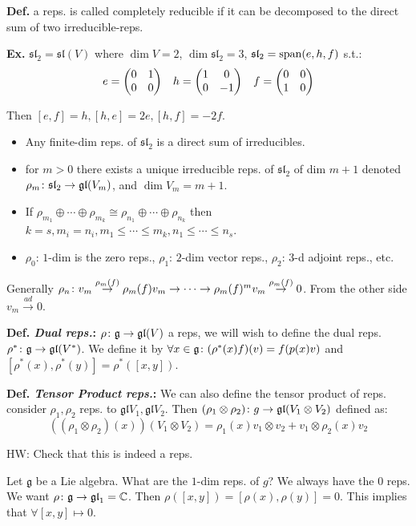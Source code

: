 \documentclass[]{../../../../tex/classes/styledArticle}
\newcommand\gl {\mathfrak{gl}}
\newcommand\g  {\mathfrak{g}}
\newcommand\Sl {\mathfrak{sl}}
\begin{document}
	\textbf{Def. }a reps. is called completely reducible if it can be decomposed to the direct sum of two irreducible-reps. 
	
	\textbf{Ex. }$\Sl_2 = \Sl(V)$ where $\dim V = 2$, $\dim \Sl_2 = 3$, $\Sl_2 = \Sp(e, h, f)$ s.t.: 
	\begin{align*}
		e = \begin{pmatrix} 0 & 1 \\ 0 & 0 \end{pmatrix} && h = \begin{pmatrix} 1 & 0 \\ 0 & -1 \end{pmatrix} && f = \begin{pmatrix} 0 & 0 \\ 1 & 0 \end{pmatrix}
	\end{align*}
	
	Then $[e, f] = h, [h, e] = 2e, [h, f] = -2f$. 
	
	\begin{itemize}
		\item Any finite-dim reps. of $\Sl_2$ is a direct sum of irreducibles. 
		\item for $m > 0$ there exists a unique irreducible reps. of $\Sl_2$ of dim $m + 1$ denoted $\rho_m \co \Sl_2 \to \gl(V_m)$, and $\dim V_m = m + 1$. 
		\item If $\rho_{m_1} \oplus \cdots \oplus \rho_{m_k} \cong \rho_{n_1} \oplus \cdots \oplus \rho_{n_k}$ then $k = s, m_i = n_i, m_1 \le \cdots \le m_k, n_1 \le \cdots \le n_s$. 
		\item $\rho_0$: $1$-dim is the zero reps., $\rho_1$: $2$-dim vector reps., $\rho_2$: $3$-d adjoint reps., etc.
	\end{itemize}
	Generally $\rho_n\colon v_m \overset{\rho_m(f)}{\to} \rho_m(f)v_m \to \cdots \to \rho_m(f)^{m}v_m \overset{\rho_m(f)}{\to} 0$. From the other side $v_m \overset{ad}{\to} 0 $. 
	
	\textbf{Def. \textit{Dual reps.}: }$\rho \co \g \to \gl(V)$ a reps, we will wish to define the dual reps. $\rho^* \co \g \to \gl(V^*)$. We define it by $\forall x \in \g \co (\rho^*(x)f)(v) = f(p(x)v)$ and $[\rho^*(x), \rho^*(y)] = \rho^*([x, y])$. 
	
	\textbf{Def. \textit{Tensor Product reps.}: }We can also define the tensor product of reps. consider $\rho_1, \rho_2$ reps. to $\gl V_1, \gl V_2$. Then $(\rho_1\otimes \rho_2) \co g \to \gl(V_1 \otimes V_2)$ defined as: 
	\[ ((\rho_1 \otimes \rho_2)(x))(V_1 \otimes V_2) = \rho_1(x)v_1\otimes v_2 + v_1 \otimes \rho_2(x)v_2 \]
	
	HW: Check that this is indeed a reps. 
	
	Let $\g$ be a Lie algebra. What are the $1$-dim reps. of $g$? We always have the $0$ reps. We want $\rho \co \g \to \gl_1 = \C$. Then $\rho([x, y]) = [\rho(x), \rho(y)] = 0$. This implies that $\forall [x, y] \mapsto 0$. 
	
\end{document}
